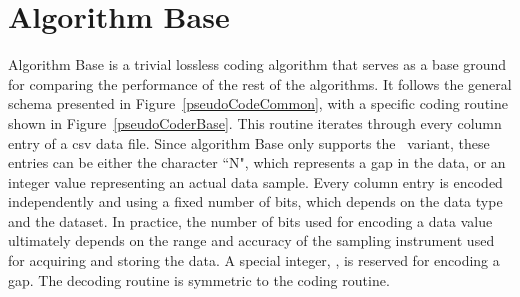 

\vspace{-10pt}
\section{Algorithm Base}
\label{algo:base}
\newcommand{\codeColumn}{$\text{code\_column}$}
\newcommand{\decodeColumn}{$\text{decode\_column}$}

\vspace{-5pt}
Algorithm Base is a trivial lossless coding algorithm that serves as a base ground for comparing the performance of the rest of the algorithms. It follows the general schema presented in Figure~\ref{pseudoCodeCommon}, with a specific coding routine shown in Figure~\ref{pseudoCoderBase}. This routine iterates through every column entry of a csv data file. Since algorithm Base only supports the \NOmaskalgo\ variant, these entries can be either the character ``N", which represents a gap in the data, or an integer value representing an actual data sample. Every column entry is encoded independently and using a fixed number of bits, which depends on the data type and the dataset. In practice, the number of bits used for encoding a data value ultimately depends on the range and accuracy of the sampling instrument used for acquiring and storing the data. A special integer, \nodata, is reserved for encoding a gap. The decoding routine is symmetric to the coding routine.




